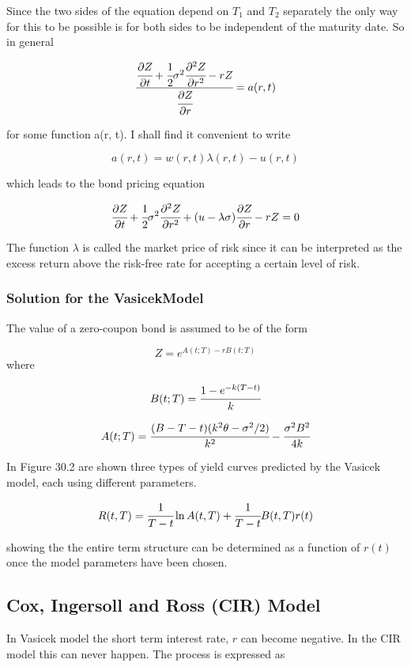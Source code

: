 Since the two sides of the equation depend on \(T_1\) and \(T_2\)
separately the only way for this to be possible is for both sides to be
independent of the maturity date. So in general

\[\cfrac{\cfrac{\partial Z}{\partial t} + \cfrac{1}{2}\sigma^2 \cfrac{\partial^2 Z}{\partial r^2} - rZ}{\cfrac{\partial Z}{\partial r}}= a(r, t)
\]

for some function a(r, t). I shall find it convenient to write

\[a(r, t) = w(r, t )\lambda(r, t ) − u(r, t)\]

which leads to the bond pricing equation

\[\cfrac{\partial Z}{\partial t} + \cfrac{1}{2}\sigma^2 \cfrac{\partial^2 Z}{\partial r^2} + (u - \lambda\sigma)\cfrac{\partial Z}{\partial r} - rZ = 0
\]

The function \(\lambda\) is called the market price of risk since it can
be interpreted as the excess return above the risk-free rate for
accepting a certain level of risk.

 \subsubsection{Solution for the VasicekModel}
 \label{solution-for-the-vasicek-model}

The value of a zero-coupon bond is assumed to be of the form

\[ Z = e^{A(t;T)−rB(t;T)} \]
where

\[B(t; T) = \cfrac{1 - e^{-k(T-t)}}{k}\]

\[A(t; T) = \cfrac{(B - T - t)(k^2\theta - \sigma^2/2)}{k^2} - \cfrac{\sigma^2 B^2}{4k}\]

In Figure 30.2 are shown three types of yield curves predicted by the
Vasicek model, each using different parameters.

\[R(t, T) = \cfrac{1}{T-t}\ln A(t,T)+\cfrac{1}{T-t}B(t, T)r(t)\]

showing the the entire term structure can be determined as a function of
\(r(t)\) once the model parameters have been chosen.

\subsection{Cox, Ingersoll and Ross (CIR) Model}
\label{cox-ingersoll-and-ross-cir-model}

In Vasicek model the short term interest rate, \(r\) can become
negative. In the CIR model this can never happen. The process is
expressed as

